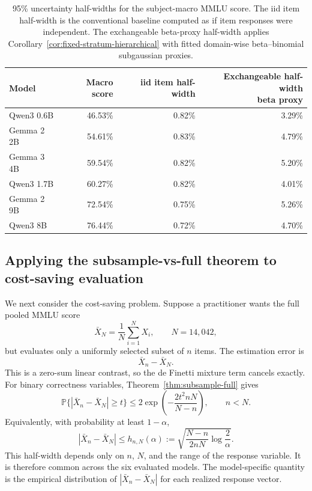 \documentclass[11pt]{article}
\newcommand{\Pbb}{\mathbb{P}}
\theoremstyle{definition}
\theoremstyle{remark}
\begin{document}
\begin{table}[H]
\centering
\caption{95\% uncertainty half-widths for the subject-macro MMLU score. The iid item half-width is the conventional baseline computed as if item responses were independent. The exchangeable beta-proxy half-width applies Corollary~\ref{cor:fixed-stratum-hierarchical} with fitted domain-wise beta--binomial subgaussian proxies.}
\label{tab:mmlu-theorem-uq}
\begin{tabular}{lrrr}
\toprule
Model & Macro score & iid item half-width & \makecell{Exchangeable half-width\\beta proxy} \\
\midrule
Qwen3 0.6B & 46.53\% & 0.82\% & 3.29\% \\
Gemma 2 2B & 54.61\% & 0.83\% & 4.79\% \\
Gemma 3 4B & 59.54\% & 0.82\% & 5.20\% \\
Qwen3 1.7B & 60.27\% & 0.82\% & 4.01\% \\
Gemma 2 9B & 72.54\% & 0.75\% & 5.26\% \\
Qwen3 8B & 76.44\% & 0.72\% & 4.70\% \\
\bottomrule
\end{tabular}

\end{table}



\subsection{Applying the subsample-vs-full theorem to cost-saving evaluation}

We next consider the cost-saving problem.  Suppose a practitioner wants the
full pooled MMLU score
\[
    \bar X_N=\frac1N\sum_{i=1}^N X_i,
    \qquad N=14{,}042,
\]
but evaluates only a uniformly selected subset of \(n\) items.  The estimation
error is
\[
    \bar X_n-\bar X_N.
\]
This is a zero-sum linear contrast, so the de Finetti mixture term cancels
exactly. For binary correctness variables, Theorem~\ref{thm:subsample-full}
gives
\[
    \Pbb\{|\bar X_n-\bar X_N|\ge t\}
    \le
    2\exp\left(-\frac{2t^2nN}{N-n}\right),
    \qquad n<N.
\]
Equivalently, with probability at least \(1-\alpha\),
\[
    |\bar X_n-\bar X_N|
    \le
    h_{n,N}(\alpha)
    :=
    \sqrt{\frac{N-n}{2nN}\log\frac2\alpha}.
\]
This half-width depends only on \(n\), \(N\), and the range of the response
variable. It is therefore common across the six evaluated models.  The
model-specific quantity is the empirical distribution of
\(|\bar X_n-\bar X_N|\) for each realized response vector.
\end{document}
